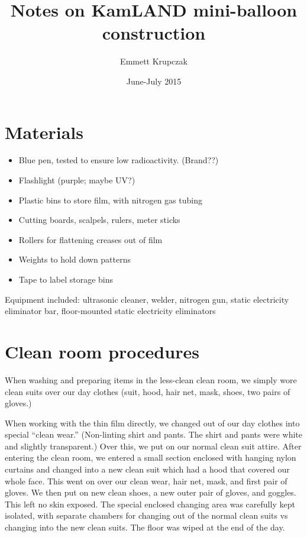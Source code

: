 \documentclass{article}
\title{Notes on KamLAND mini-balloon construction}
\date{June-July 2015}
\author{Emmett Krupczak}
\begin{document}
\maketitle


\section{Materials}
\begin{itemize}
\item Blue pen, tested to ensure low radioactivity. (Brand??)
\item Flashlight (purple; maybe UV?)
\item Plastic bins to store film, with nitrogen gas tubing
\item Cutting boards, scalpels, rulers, meter sticks
\item Rollers for flattening creases out of film
\item Weights to hold down patterns
\item Tape to label storage bins
\end{itemize}
Equipment included: ultrasonic cleaner, welder, nitrogen gun, static electricity eliminator bar, floor-mounted static electricity eliminators

\section{Clean room procedures}
When washing and preparing items in the less-clean clean room, we simply wore clean suits over our day clothes (suit, hood, hair net, mask, shoes, two pairs of gloves.) 

When working with the thin film directly, we changed out of our day clothes into special ``clean wear.'' (Non-linting shirt and pants. The shirt and pants were white and slightly transparent.) Over this, we put on our normal clean suit attire. After entering the clean room, we entered a small section enclosed with hanging nylon curtains and changed into a new clean suit which had a hood that covered our whole face. This went on over our clean wear, hair net, mask, and first pair of gloves. We then put on new clean shoes, a new outer pair of gloves, and goggles. This left no skin exposed. 
The special enclosed changing area was carefully kept isolated, with separate chambers for changing out of the normal clean suits vs changing into the new clean suits. The floor was wiped at the end of the day. 
\end{document}
